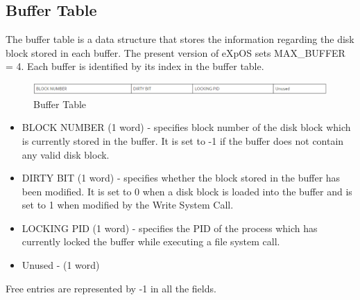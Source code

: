 \subsection {Buffer Table}
The buffer table is a data structure that stores the information regarding the disk block stored in each buffer. The present version of eXpOS sets MAX\_BUFFER = 4. Each buffer is identified by its index in the buffer table.
\begin{figure}[ht]
\centering
\includegraphics  [scale=0.55]{figures/bt.png}
\caption{\footnotesize Buffer Table}
\end{figure}
\begin {itemize}
\item BLOCK NUMBER (1 word) - specifies block number of the disk block which is currently stored in the buffer. It is set to -1 if the buffer does not contain any valid disk block.
\item DIRTY BIT (1 word) - specifies whether the block stored in the buffer has been modified. It is set to 0 when a disk block is loaded into the buffer and is set to 1 when modified by the Write System Call.
\item LOCKING PID (1 word) - specifies the PID of the process which has currently locked the buffer while executing a file system call.
\item Unused - (1 word)
\end {itemize}

Free entries are represented by -1 in all the fields.

